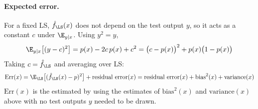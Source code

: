 \paragraph{Expected error.}
For a fixed LS, $\hat{f}_{\LS}(x)$ does not depend on the test output $y$, so it acts as a constant $c$ under $\E_{y \mid x}$. Using $y^2=y$,
\[
\E_{y\mid x}\big[(y-c)^2\big]=p(x)-2c\,p(x)+c^2=\big(c-p(x)\big)^2+p(x)\big(1-p(x)\big)
\]
Taking $c=\hat{f}_{\LS}$ and averaging over LS:
\[
\mathrm{Err}(x)=\E_{\LS}\big[(\hat{f}_{\LS}(x)-p)^2\big]+\text{residual error}(x)=\text{residual error}(x)+\text{bias}^2(x)+\text{variance}(x)
\]
$\mathrm{Err}(x)$ is the estimated by using the estimates of $\text{bias}^2(x)$ and $\text{variance}(x)$ above with no test outputs $y$ needed to be drawn.
